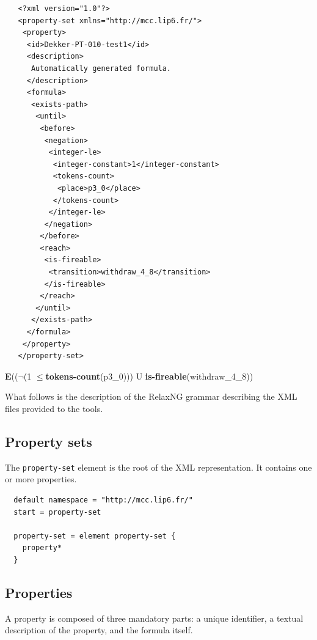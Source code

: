 \documentclass[10pt,english,a4paper]{article}
\newcommand\ctle             {\textbf{E}\xspace}
\newcommand\logicnot         {\boldmath$\lnot$\xspace}
\newcommand\atomleq          {\boldmath$\leq$\xspace}
\newcommand\atomisfire[1]    {\textbf{is-fireable}(#1)}
\newcommand\atomtokenscnt[1] {\textbf{tokens-count}(#1)}
\newcommand\mysubsection[1]{\color{sectioncolor}\subsection{#1}\color{defaultcolor}}
\begin{document}
\begin{multicols}{2}
\begin{lstlisting}
   <?xml version="1.0"?>
   <property-set xmlns="http://mcc.lip6.fr/">
    <property>
     <id>Dekker-PT-010-test1</id>
     <description>
      Automatically generated formula.
     </description>
     <formula>
      <exists-path>
       <until>
        <before>
         <negation>
          <integer-le>
           <integer-constant>1</integer-constant>
           <tokens-count>
            <place>p3_0</place>
           </tokens-count>
          </integer-le>
         </negation>
        </before>
        <reach>
         <is-fireable>
          <transition>withdraw_4_8</transition>
         </is-fireable>
        </reach>
       </until>
      </exists-path>
     </formula>
    </property>
   </property-set>
\end{lstlisting}
\columnbreak
\vspace*{2cm}
\ctle ((\logicnot (1 \atomleq \atomtokenscnt{p3\_0})) U \atomisfire{withdraw\_4\_8})
\end{multicols}

What follows is the description of the RelaxNG grammar describing the XML
files provided to the tools.

\mysubsection{Property sets}
The \lstinline[language=xsd]!property-set! element is the root of the XML representation.
It contains one or more properties.
\begin{lstlisting}
  default namespace = "http://mcc.lip6.fr/"
  start = property-set

  property-set = element property-set {
    property*
  }
\end{lstlisting}

\mysubsection{Properties}
A property is composed of three mandatory parts: a unique identifier, a textual description
of the property, and the formula itself.

\end{document}
